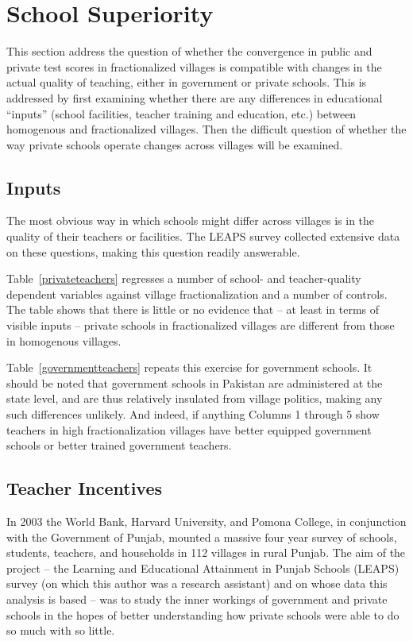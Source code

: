 \documentclass[12pt]{article}
\begin{document}
\section{School Superiority}\label{overview}

This section address the question of whether the convergence in public and private test scores in fractionalized villages is compatible with changes in the actual quality of teaching, either in government or private schools. This is addressed by first examining whether there are any differences in educational ``inputs'' (school facilities, teacher training and education, etc.) between homogenous and fractionalized villages. Then the difficult question of whether the way private schools operate changes across villages will be examined. 

\subsection{Inputs}\label{}

The most obvious way in which schools might differ across villages is in the quality of their teachers or facilities. The LEAPS survey collected extensive data on these questions, making this question readily answerable.

Table~\ref{privateteachers} regresses a number of school- and teacher-quality dependent variables against village fractionalization and a number of controls. The table shows that there is little or no evidence that -- at least in terms of visible inputs -- private schools in fractionalized villages are different from those in homogenous villages. 


Table~\ref{governmentteachers} repeats this exercise for government schools. It should be noted that government schools in Pakistan are administered at the state level, and are thus relatively insulated from village politics, making any such differences unlikely. And indeed, if anything Columns 1 through 5 show teachers in high fractionalization villages have better equipped government schools or better trained government teachers. 



\subsection{Teacher Incentives}\label{}

In 2003 the World Bank, Harvard University, and Pomona College, in conjunction with the Government of Punjab, mounted a massive four year survey of schools, students, teachers, and households in 112 villages in rural Punjab. The aim of the project -- the Learning and Educational Attainment in Punjab Schools (LEAPS) survey (on which this author was a research assistant) and on whose data this analysis is based -- was to study the inner workings of government and private schools in the hopes of better understanding how private schools were able to do so much with so little. 
\end{document}
